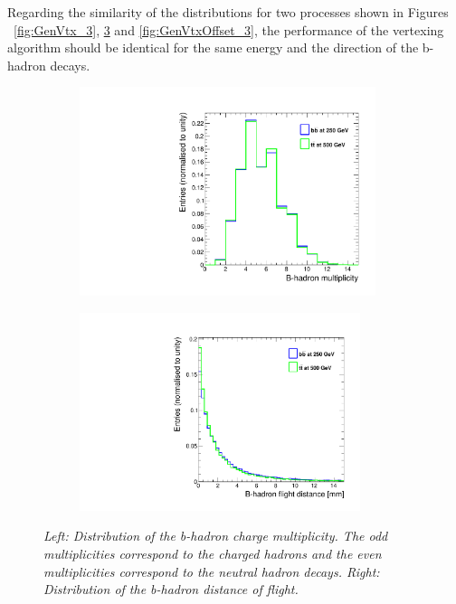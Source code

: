 Regarding the similarity of the distributions for two processes shown in Figures ~\ref{fig:GenVtx_3}, \ref{fig:GenHadronParams_3} and \ref{fig:GenVtxOffset_3}, the performance of the vertexing algorithm should be identical for the same energy and the direction of the b-hadron decays.


\begin{figure}[h]
\centering
\begin{subfigure}{0.5\textwidth}
    \includegraphics[width=0.95\textwidth]{ILD/plots/gen-hadron-multiplicity.pdf}
\caption{\label{fig:GenHadronParams_a_3} }
\end{subfigure}%
  \begin{subfigure}{0.5\textwidth}
\centering
    \includegraphics[width=0.9\textwidth]{ILD/plots/gen-hadron-distance.pdf}
\caption{\label{fig:GenHadronParams_b_3} }
\end{subfigure}
    \caption{\sl Left: Distribution of the b-hadron charge multiplicity. The odd multiplicities correspond to the charged hadrons and the even multiplicities correspond to the neutral hadron decays.   Right: Distribution of the b-hadron distance of flight. }
    \label{fig:GenHadronParams_3}
\end{figure}

